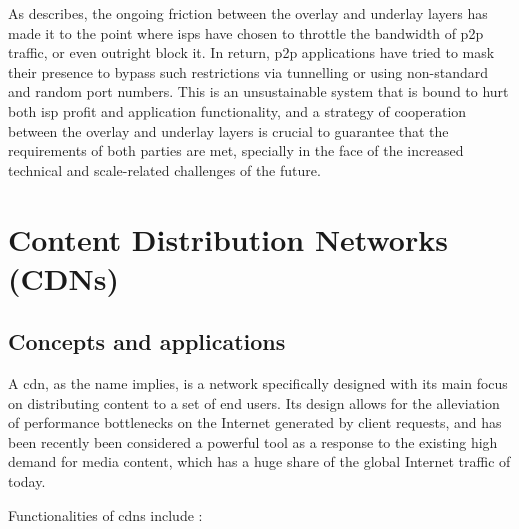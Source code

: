     As \cite{dan-Commag10} describes, the ongoing friction between the overlay and underlay layers has made it to the point where \glspl{isp} have chosen to throttle the bandwidth of \gls{p2p} traffic, or even outright block it.
    In return, \gls{p2p} applications have tried to mask their presence to bypass such restrictions via tunnelling or using non-standard and random port numbers.
    This is an unsustainable system that is bound to hurt both \gls{isp} profit and application functionality, and a strategy of cooperation between the overlay and underlay layers is crucial to guarantee that the requirements of both parties are met, specially in the face of the increased technical and scale-related challenges of the future.

\section{Content Distribution Networks (CDNs)}

\label{sec:state-cdn}

\subsection{Concepts and applications}

\label{ssec:cdn-concepts}

   A \gls{cdn}, as the name implies, is a network specifically designed with its main focus on distributing content to a set of end users.
   Its design allows for the alleviation of performance bottlenecks on the Internet generated by client requests, and has been recently been considered a powerful tool as a response to the existing high demand for media content, which has a huge share of the global Internet traffic of today.

   Functionalities of \glspl{cdn} include \cite{cdn-survey}:

